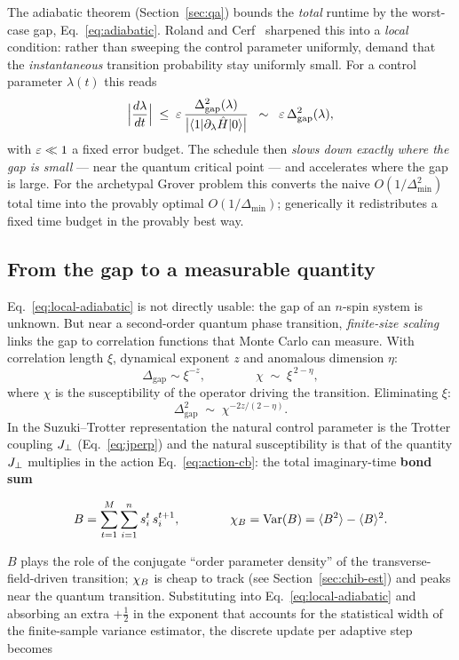 The adiabatic theorem (Section~\ref{sec:qa}) bounds the \emph{total} runtime
by the worst-case gap, Eq.~\eqref{eq:adiabatic}. Roland and
Cerf~\cite{rolandcerf} sharpened this into a \emph{local} condition: rather
than sweeping the control parameter uniformly, demand that the
\emph{instantaneous} transition probability stay uniformly small. For a
control parameter $\lambda(t)$ this reads
\begin{equation}
\Bigl|\frac{d\lambda}{dt}\Bigr|
\;\le\;\varepsilon\,
\frac{\Delta_{\mathrm{gap}}^2(\lambda)}{\bigl|\langle 1\rvert\partial_\lambda\hat H\lvert 0\rangle\bigr|}
\;\;\sim\;\;\varepsilon\,\Delta_{\mathrm{gap}}^2(\lambda),
\label{eq:local-adiabatic}
\end{equation}
with $\varepsilon\ll1$ a fixed error budget. The schedule then \emph{slows down
exactly where the gap is small} --- near the quantum critical point --- and
accelerates where the gap is large. For the archetypal Grover problem this
converts the naive $O(1/\Delta_{\min}^2)$ total time into the provably
optimal $O(1/\Delta_{\min})$; generically it redistributes a fixed time
budget in the provably best way.

\subsection{From the gap to a measurable quantity}

Eq.~\eqref{eq:local-adiabatic} is not directly usable: the gap of an
$n$-spin system is unknown. But near a second-order quantum phase
transition, \emph{finite-size scaling} links the gap to correlation
functions that Monte Carlo can measure. With correlation length $\xi$,
dynamical exponent $z$ and anomalous dimension $\eta$:
\begin{equation}
\Delta_{\mathrm{gap}}\sim\xi^{-z},
\qquad\qquad
\chi\;\sim\;\xi^{\,2-\eta},
\end{equation}
where $\chi$ is the susceptibility of the operator driving the transition.
Eliminating $\xi$:
\begin{equation}
\Delta_{\mathrm{gap}}^2 \;\sim\; \chi^{-2z/(2-\eta)} .
\end{equation}
In the Suzuki--Trotter representation the natural control parameter is the
Trotter coupling $J_{\perp}$ (Eq.~\eqref{eq:jperp}) and the natural susceptibility
is that of the quantity $J_{\perp}$ multiplies in the action
Eq.~\eqref{eq:action-cb}: the total imaginary-time \textbf{bond sum}
\begin{keyeq}
\begin{equation}
B=\sum_{t=1}^{M}\sum_{i=1}^{n} s^t_i\,s^{t+1}_i,
\qquad\qquad
\chi_B=\operatorname{Var}(B)=\langle B^2\rangle-\langle B\rangle^2 .
\label{eq:chiB}
\end{equation}
\end{keyeq}
$B$ plays the role of the conjugate ``order parameter density'' of the
transverse-field-driven transition; $\chi_B$ is cheap to track (see
Section~\ref{sec:chib-est}) and peaks near the quantum transition.
Substituting into Eq.~\eqref{eq:local-adiabatic} and absorbing an extra
$+\tfrac12$ in the exponent that accounts for the statistical width of the
finite-sample variance estimator, the discrete update per adaptive step
becomes


